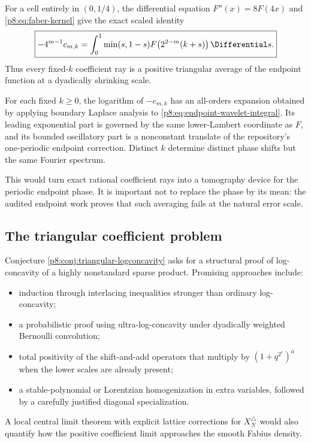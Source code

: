 \documentclass[11pt]{article}
\theoremstyle{definition}
\theoremstyle{remark}
\begin{document}
For a cell entirely in $(0,1/4)$, the differential equation
$F''(x)=8F(4x)$ and \eqref{p8:eq:faber-kernel} give the exact scaled identity
\begin{equation}
 \boxed{\displaystyle
 -4^{m-1}c_{m,k}
 =\int_0^1\min(s,1-s)
 F\!\left(2^{2-m}(k+s)\right)\Differential s.}                    \label{p8:eq:endpoint-wavelet-integral}
\end{equation}
Thus every fixed-$k$ coefficient ray is a positive triangular average of the
endpoint function at a dyadically shrinking scale.

\begin{conjecture}
\label{p8:conj:wavelet-phase}
For each fixed $k\ge0$, the logarithm of
$-c_{m,k}$ has an all-orders expansion obtained by applying boundary Laplace
analysis to \eqref{p8:eq:endpoint-wavelet-integral}.  Its leading exponential
part is governed by the same lower-Lambert coordinate as $F$, and its bounded
oscillatory part is a nonconstant translate of the repository's one-periodic
endpoint correction.  Distinct $k$ determine distinct phase shifts but the
same Fourier spectrum.
\end{conjecture}

This would turn exact rational coefficient rays into a tomography device for
the periodic endpoint phase.  It is important not to replace the phase by its
mean: the audited endpoint work proves that such averaging fails at the
natural error scale.

\subsection{The triangular coefficient problem}

Conjecture \ref{p8:conj:triangular-logconcavity} asks for a structural proof of
log-concavity of a highly nonstandard sparse product.  Promising approaches
include:
\begin{itemize}
\item induction through interlacing inequalities stronger than ordinary
      log-concavity;
\item a probabilistic proof using ultra-log-concavity under dyadically
      weighted Bernoulli convolution;
\item total positivity of the shift-and-add operators that multiply by
      $(1+q^{2^r})^a$ when the lower scales are already present;
\item a stable-polynomial or Lorentzian homogenization in extra variables,
      followed by a carefully justified diagonal specialization.
\end{itemize}
A local central limit theorem with explicit lattice corrections for
$X_N^\triangle$ would also quantify how the positive coefficient limit
approaches the smooth Fabius density.
\end{document}

